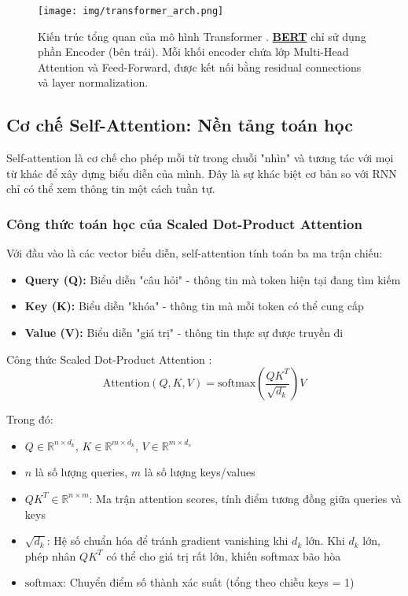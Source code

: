 \begin{figure}[H]
    \centering
    \texttt{[image: img/transformer\_arch.png]}
    \caption{Kiến trúc tổng quan của mô hình Transformer \cite{vaswani2017attention}. \hyperref[acro:bert]{\textbf{BERT}} chỉ sử dụng phần Encoder (bên trái). Mỗi khối encoder chứa lớp Multi-Head Attention và Feed-Forward, được kết nối bằng residual connections và layer normalization.}
    \label{fig:transformer_architecture}
\end{figure}

\subsection{Cơ chế Self-Attention: Nền tảng toán học}
\label{ssec:self_attention}

Self-attention là cơ chế cho phép mỗi từ trong chuỗi "nhìn" và tương tác với mọi từ khác để xây dựng biểu diễn của mình. Đây là sự khác biệt cơ bản so với RNN chỉ có thể xem thông tin một cách tuần tự.

\subsubsection{Công thức toán học của Scaled Dot-Product Attention}
Với đầu vào là các vector biểu diễn, self-attention tính toán ba ma trận chiếu:
\begin{itemize}
    \item \textbf{Query (Q):} Biểu diễn "câu hỏi" - thông tin mà token hiện tại đang tìm kiếm
    \item \textbf{Key (K):} Biểu diễn "khóa" - thông tin mà mỗi token có thể cung cấp
    \item \textbf{Value (V):} Biểu diễn "giá trị" - thông tin thực sự được truyền đi
\end{itemize}

Công thức Scaled Dot-Product Attention \cite{vaswani2017attention}:
\begin{equation}
\text{Attention}(Q, K, V) = \text{softmax}\left(\frac{QK^T}{\sqrt{d_k}}\right)V
\label{eq:scaled_attention}
\end{equation}

Trong đó:
\begin{itemize}
    \item $Q \in \mathbb{R}^{n \times d_k}$, $K \in \mathbb{R}^{m \times d_k}$, $V \in \mathbb{R}^{m \times d_v}$
    \item $n$ là số lượng queries, $m$ là số lượng keys/values
    \item $QK^T \in \mathbb{R}^{n \times m}$: Ma trận attention scores, tính điểm tương đồng giữa queries và keys
    \item $\sqrt{d_k}$: Hệ số chuẩn hóa để tránh gradient vanishing khi $d_k$ lớn. Khi $d_k$ lớn, phép nhân $QK^T$ có thể cho giá trị rất lớn, khiến softmax bão hòa
    \item $\text{softmax}$: Chuyển điểm số thành xác suất (tổng theo chiều keys = 1)
\end{itemize}

